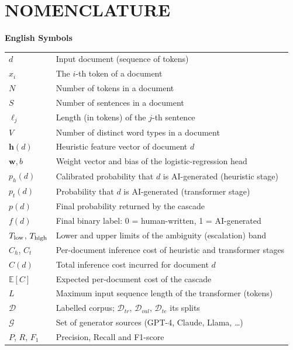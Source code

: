 \chapter*{NOMENCLATURE}
\begingroup
\renewcommand{\arraystretch}{1.18}
\textbf{English Symbols}\par
\begin{longtable}{@{}p{3.0cm}p{11.0cm}@{}}
$d$                 & Input document (sequence of tokens) \\
$x_i$               & The $i$-th token of a document \\
$N$                 & Number of tokens in a document \\
$S$                 & Number of sentences in a document \\
$\ell_j$            & Length (in tokens) of the $j$-th sentence \\
$V$                 & Number of distinct word types in a document \\
$\mathbf{h}(d)$     & Heuristic feature vector of document $d$ \\
$\mathbf{w}, b$     & Weight vector and bias of the logistic-regression head \\
$p_h(d)$            & Calibrated probability that $d$ is AI-generated (heuristic stage) \\
$p_t(d)$            & Probability that $d$ is AI-generated (transformer stage) \\
$p(d)$              & Final probability returned by the cascade \\
$f(d)$              & Final binary label: 0 = human-written, 1 = AI-generated \\
$T_{\mathrm{low}}$, $T_{\mathrm{high}}$   & Lower and upper limits of the ambiguity (escalation) band \\
$C_h$, $C_t$        & Per-document inference cost of heuristic and transformer stages \\
$C(d)$              & Total inference cost incurred for document $d$ \\
$\mathbb{E}[C]$     & Expected per-document cost of the cascade \\
$L$                 & Maximum input sequence length of the transformer (tokens) \\
$\mathcal{D}$       & Labelled corpus; $\mathcal{D}_{tr}$, $\mathcal{D}_{val}$, $\mathcal{D}_{te}$ its splits \\
$\mathcal{G}$       & Set of generator sources (GPT-4, Claude, Llama, \ldots) \\
$P$, $R$, $F_1$     & Precision, Recall and F1-score \\
\end{longtable}


